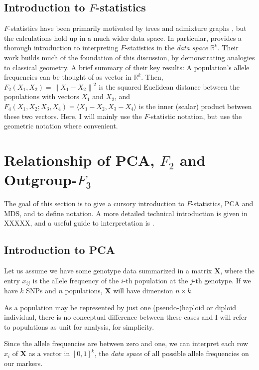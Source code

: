\documentclass[12pt,a4pape, fullpage]{article}
\newcommand{\normsq}[1]{\left\lVert#1\right\rVert^2}
\newcommand{\MX}{\mathbf{X}} %
\begin{document}
\subsection{Introduction to $F$-statistics}
$F$-statistics have been primarily motivated by trees and admixture graphs \citep{patterson2012, peter2016}, but the calculations hold up in a much wider data space. In particular,  \cite{oteo-garcia2021} provides a thorough introduction to interpreting $F$-statistics in the \emph{data space} $\mathbb{R}^k$. Their work builds much of the foundation of this discussion, by demonstrating analogies to classical geometry. A brief summary of their key results: A population's allele frequencies can be thought of as vector in $\mathbb{R}^k$. Then, $F_2(X_1, X_2) = \normsq{X_1 - X_2}$ is the squared Euclidean distance between the populations with vectors $X_1$ and $X_2$, and $F_4(X_1, X_2 ; X_3, X_4) = \langle X_1 - X_2, X_3 - X_4 \rangle$ is the inner (scalar) product between these two vectors. Here, I will mainly use the $F$-statistic notation, but use the geometric notation where convenient.



	
\section{Relationship of PCA, $F_2$ and Outgroup-$F_3$}

The goal of this section is to give a cursory introduction to $F$-statistics, PCA and MDS, and to define notation. A more detailed technical introduction is given in XXXXX, and a useful guide to interpretation is \cite{cavalli-sforza1994}.

\subsection{Introduction to PCA}
	Let us assume we have some genotype data summarized in a matrix $\MX$, where the entry $x_{ij}$ is the allele frequency of the $i$-th population at the $j$-th genotype. If we have $k$ SNPs and $n$ populations, $\MX$ will have dimension $n \times k$. 
	
    As a population may be represented by just one (pseudo-)haploid or diploid individual, there is no conceptual difference between these cases and I will refer to populations as unit for analysis, for simplicity. 
    
    Since the allele frequencies are between zero and one, we can interpret each row $x_i$ of $\MX$ as a vector in $[0, 1]^k$, the \emph{data space} of all possible allele frequencies on our markers.
	
\end{document}
